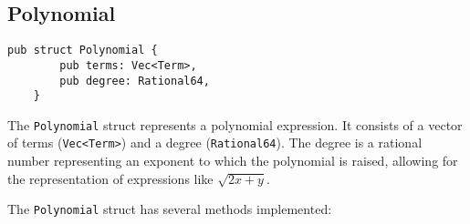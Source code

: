 \subsection{Polynomial}\label{subsec:polynomial}

\begin{lstlisting}[caption={The \texttt{Polynomial} struct}, label={lst:polynomial}]
    pub struct Polynomial {
        pub terms: Vec<Term>,
        pub degree: Rational64,
    }
\end{lstlisting}


The \verb|Polynomial| struct represents a polynomial expression. It consists of a vector of terms (\verb|Vec<Term>|) and a degree (\verb|Rational64|). The degree is a rational number representing an exponent to which the polynomial is raised, allowing for the representation of expressions like $\sqrt{2x + y}$.

The \verb|Polynomial| struct has several methods implemented:

